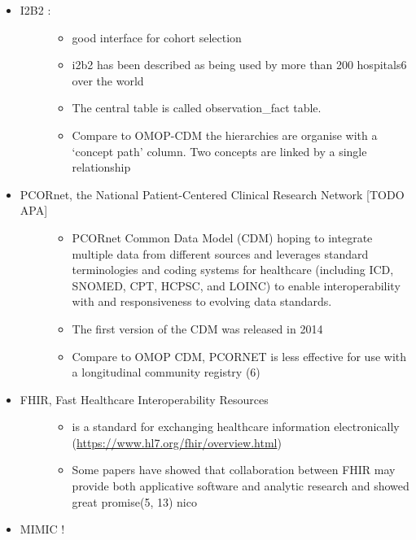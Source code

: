 \begin{itemize}
\item
  \begin{description}
  \item[I2B2 :]
  \begin{itemize}
  \tightlist
  \item
    good interface for cohort selection
  \item
    i2b2 has been described as being used by more than 200 hospitals6
    over the world
  \item
    The central table is called observation\_fact table.
  \item
    Compare to OMOP-CDM the hierarchies are organise with a `concept
    path' column. Two concepts are linked by a single relationship
  \end{itemize}
  \end{description}
\item
  \begin{description}
  \item[PCORnet, the National Patient-Centered Clinical Research Network
  {[}TODO APA{]}]
  \begin{itemize}
  \tightlist
  \item
    PCORnet Common Data Model (CDM) hoping to integrate multiple data
    from different sources and leverages standard terminologies and
    coding systems for healthcare (including ICD, SNOMED, CPT, HCPSC,
    and LOINC) to enable interoperability with and responsiveness to
    evolving data standards.
  \item
    The first version of the CDM was released in 2014
  \item
    Compare to OMOP CDM, PCORNET is less effective for use with a
    longitudinal community registry (6)
  \end{itemize}
  \end{description}
\item
  \begin{description}
  \item[FHIR, Fast Healthcare Interoperability Resources]
  \begin{itemize}
  \tightlist
  \item
    is a standard for exchanging healthcare information electronically
    (\url{https://www.hl7.org/fhir/overview.html})
  \item
    Some papers have showed that collaboration between FHIR may provide
    both applicative software and analytic research and showed great
    promise(5, 13) nico
  \end{itemize}
  \end{description}
\item
  MIMIC !
\end{itemize}

